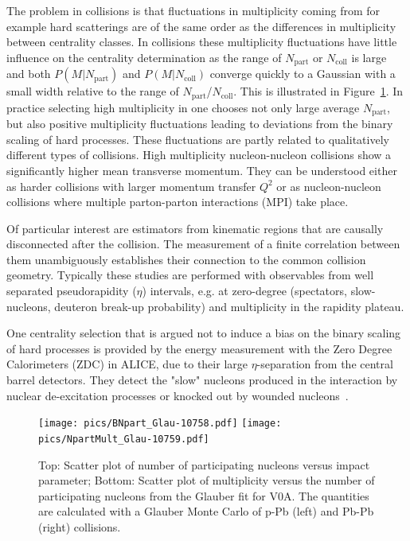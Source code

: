 The problem in \pPb collisions is that fluctuations in multiplicity coming from for example hard scatterings are of the same order as the differences in multiplicity between centrality classes. In \PbPb collisions these multiplicity fluctuations have little influence on the centrality determination as the range of $N_\mathrm{part}$ or $N_\mathrm{coll}$ is large and both $P\left(M|N_\mathrm{part}\right)$ and $P\left(M|N_\mathrm{coll}\right)$ converge quickly to a Gaussian with a small width relative to the range of $N_\mathrm{part}$/$N_\mathrm{coll}$. This is illustrated in Figure~\ref{fig:pPbMult}. In practice selecting high multiplicity in \pPb one chooses not only large average $N_\mathrm{part}$, but also positive multiplicity fluctuations leading to deviations from the binary scaling of hard processes. These fluctuations are partly related to qualitatively different types of collisions. High multiplicity nucleon-nucleon collisions show a significantly higher mean transverse momentum. They can be understood either as harder collisions with larger momentum transfer $Q^2$ or as nucleon-nucleon collisions where multiple parton-parton interactions (MPI) take place. 

Of particular interest are estimators from kinematic regions that are causally disconnected after the collision. The measurement of a finite correlation between them unambiguously establishes their connection to the common collision geometry. Typically these studies are performed with observables from well separated pseudorapidity ($\eta$) intervals, e.g. at zero-degree (spectators, slow-nucleons, deuteron break-up probability) and multiplicity in the rapidity plateau.

One centrality selection that is argued not to induce a bias on the binary scaling of hard processes is provided by the energy measurement with the Zero Degree Calorimeters (ZDC) in ALICE, due to their large $\eta$-separation from the central barrel detectors. They detect the "slow" nucleons produced in the interaction by nuclear de-excitation processes or knocked out by wounded nucleons~\cite{Sikler:2003ef}.


\begin{figure}[htb]
\centering
            	\texttt{[image: pics/BNpart\_Glau-10758.pdf]}
            	\texttt{[image: pics/NpartMult\_Glau-10759.pdf]}
                \caption{Top: Scatter plot of number of participating nucleons versus impact parameter; Bottom: Scatter plot of multiplicity versus the number of participating nucleons from the Glauber fit for V0A. The quantities are calculated with a Glauber Monte Carlo of p-Pb (left) and Pb-Pb (right) collisions.~\cite{Adam:2014qja}}
	\label{fig:pPbMult}
\end{figure}


